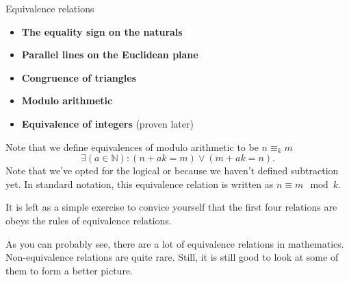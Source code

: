 \begin{exmp}{Equivalence relations}{}
  \begin{itemize}[noitemsep]
    \item \textbf{The equality sign on the naturals}
    \item \textbf{Parallel lines on the Euclidean plane}
    \item \textbf{Congruence of triangles}
    \item \textbf{Modulo arithmetic}
    \item \textbf{Equivalence of integers} (proven later)
  \end{itemize}

  Note that we define equivalences of modulo arithmetic to be \(n \equiv_k m\)
  \ifft
  \begin{equation}
    \exists(a \in \mathbb{N}) : (n + ak = m) \lor (m + ak = n).
  \end{equation}
  Note that we've opted for the logical or because we haven't defined subtraction yet. In standard
  notation, this equivalence relation is written as \(n \equiv m \mod k\).

  It is left as a simple exercise to convice yourself that the first four relations are obeys the
  rules of equivalence relations.
\end{exmp}

As you can probably see, there are a lot of equivalence relations in mathematics. Non-equivalence
relations are quite rare. Still, it is still good to look at some of them to form a better picture.

